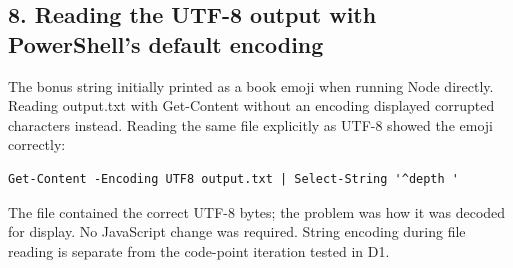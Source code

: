 \documentclass[10pt,a4paper]{article}
\begin{document}
\subsection{8. Reading the UTF-8 output with PowerShell's default encoding}

The bonus string initially printed as a book emoji when running Node directly. Reading output.txt with Get-Content without an encoding displayed corrupted characters instead. Reading the same file explicitly as UTF-8 showed the emoji correctly:

\begin{lstlisting}[language={}]
Get-Content -Encoding UTF8 output.txt | Select-String '^depth '
\end{lstlisting}

The file contained the correct UTF-8 bytes; the problem was how it was decoded for display. No JavaScript change was required. String encoding during file reading is separate from the code-point iteration tested in D1.
\end{document}
